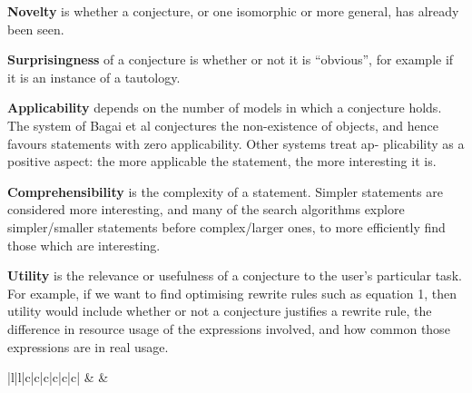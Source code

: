 {\bf Novelty} is whether a conjecture, or one isomorphic or more
general, has already been seen.

{\bf Surprisingness} of a conjecture is whether or not it is
``obvious'', for example if it is an instance of a tautology.

{\bf Applicability} depends on the number of models in which a
conjecture holds. The system of Bagai et al conjectures the
non-existence of objects, and hence favours statements with zero
applicability. Other systems treat ap- plicability as a positive
aspect: the more applicable the statement, the more interesting it is.

{\bf Comprehensibility} is the complexity of a statement. Simpler
statements are considered more interesting, and many of the search
algorithms explore simpler/smaller statements before complex/larger
ones, to more efficiently find those which are interesting.

{\bf Utility} is the relevance or usefulness of a conjecture to the
user's particular task. For example, if we want to find optimising
rewrite rules such as equation 1, then utility would include whether
or not a conjecture justifies a rewrite rule, the difference in
resource usage of the expressions involved, and how common those
expressions are in real usage.


\begin{table}
  \centering
  \begin{tabular}{ |l|l|c|c|c|c|c|c| }
    \hline
                         &
                &
     \\ \hhline{~~------}
    \tRow{            &                    & \iE & \iN & \iS & \iA & \iC & \iU}
  \end{tabular}
  \caption{Classification of ATE systems from \cite{colton2000notion}, extended
    to those compared in \cite{claessen2013automating} (QuickSpec is the
    conjecture generation component of HipSpec). The interestingness measures
    are \iE{}mpirical plausibility, \iN{}ovelty, \iS{}urprisingness,
    \iA{}pplicability, \iC{}omprehensibility (low complexity) and \iU{}tility.}
  \label{table:colton}
\end{table}

